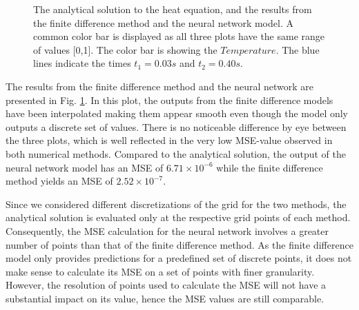 \begin{figure}[h!]
    \caption{The analytical solution to the heat equation, and the results from the finite difference method and the neural network model. A common color bar is displayed as all three plots have the same range of values [0,1]. The color bar is showing the $Temperature$. The blue lines indicate the times $t_1 = 0.03 s$ and $t_2 = 0.40 s$.}
    \label{fig:heatmaps}
\end{figure}

The results from the finite difference method and the neural network are presented in Fig. \ref{fig:heatmaps}.
In this plot, the outputs from the finite difference models have been interpolated making them appear smooth even though the model only outputs a discrete set of values. 
There is no noticeable difference by eye between the three plots, which is well reflected in the very low MSE-value observed in both numerical methods. 
Compared to the analytical solution, the output of the neural network model has an MSE of $ 6.71 \times 10^{-6}$ while the finite difference method yields an MSE of $2.52 \times 10^{-7}$. 

Since we considered different discretizations of the grid for the two methods, the analytical solution is evaluated only at the respective grid points of each method. 
Consequently, the MSE calculation for the neural network involves a greater number of points than that of the finite difference method.
As the finite difference model only provides predictions for a predefined set of discrete points, it does not make sense to calculate its MSE on a set of points with finer granularity.
However, the resolution of points used to calculate the MSE will not have a substantial impact on its value, hence the MSE values are still comparable.

